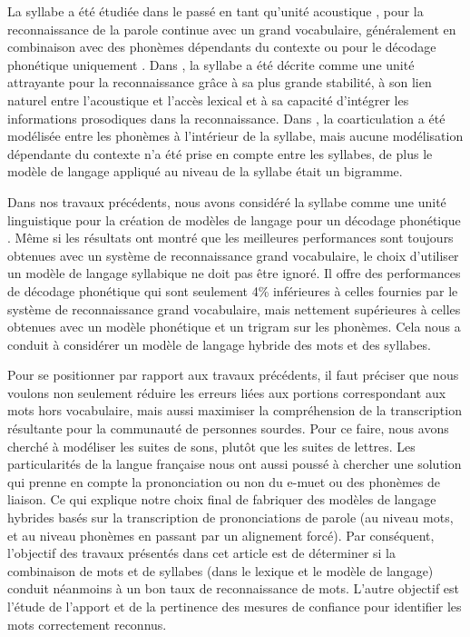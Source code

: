 \documentclass[10pt,a4paper,twoside]{article}
\begin{document}
La syllabe a été étudiée dans le passé en tant qu'unité acoustique \cite{CerfDanon1989, Wu1998,Zhang2002, Tachbelie2011}, pour la reconnaissance de la parole continue avec un grand vocabulaire, généralement en combinaison avec des phonèmes dépendants du contexte \cite{Ganapathiraju2001, Hamalainen2005} ou pour le décodage phonétique uniquement \cite{Blouch2006}. 
Dans \cite{Wu1998}, la syllabe a été décrite comme une unité attrayante pour la reconnaissance grâce à sa plus grande stabilité, à son lien naturel entre l'acoustique et l'accès lexical et à sa capacité d'intégrer les informations prosodiques dans la reconnaissance. Dans \cite{Blouch2006}, la coarticulation a été modélisée entre les phonèmes à l'intérieur de la syllabe, mais aucune modélisation dépendante du contexte n'a été prise en compte entre les syllabes, de plus le modèle de langage appliqué au niveau de la syllabe était un bigramme.

Dans nos travaux précédents, nous avons considéré la syllabe comme une unité linguistique pour la création de modèles de langage pour un décodage phonétique \cite{Orosanu2013_1}. Même si les résultats ont montré que les meilleures performances sont toujours obtenues avec un système de reconnaissance grand vocabulaire, le choix d'utiliser un modèle de langage syllabique ne doit pas être ignoré. Il offre des performances de décodage phonétique qui sont seulement 4\% inférieures à celles fournies par le système de reconnaissance grand vocabulaire, mais nettement supérieures à celles obtenues avec un modèle phonétique et un trigram sur les phonèmes. Cela nous a conduit à considérer un modèle de langage hybride des mots et des syllabes. 

Pour se positionner par rapport aux travaux précédents, il faut préciser que nous voulons non seulement réduire les erreurs liées aux portions correspondant aux mots hors vocabulaire, mais aussi maximiser la compréhension de la transcription résultante pour la communauté de personnes sourdes. Pour ce faire, nous avons cherché à modéliser les suites de sons, plutôt que les suites de lettres. Les particularités de la langue française nous ont aussi poussé à chercher une solution qui prenne en compte la prononciation ou non du e-muet ou des phonèmes de liaison. Ce qui explique notre choix final de fabriquer des modèles de langage hybrides basés sur la transcription de prononciations de parole (au niveau mots, et au niveau phonèmes en passant par un alignement forcé). 
Par conséquent, l'objectif des travaux présentés dans cet article est de déterminer si la combinaison de mots et de syllabes (dans le lexique et le modèle de langage) conduit néanmoins à un bon taux de reconnaissance de mots. L'autre objectif est l'étude de l'apport et de la pertinence des mesures de confiance pour identifier les mots correctement reconnus. 
\end{document}
